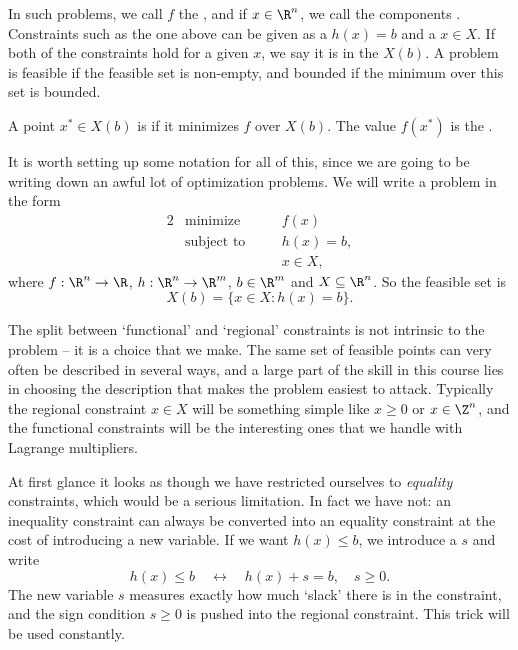 \documentclass[a4paper]{scrartcl}
\begin{document}
In such problems, we call $f$ the , and if $x \in \R^n$, we call the components . Constraints such as the one above can be given as a  $h(x) = b$ and a  $x \in X$. If both of the constraints hold for a given $x$, we say it is in the  $X(b)$. A problem is feasible if the feasible set is non-empty, and bounded if the minimum over this set is bounded.

A point $x^* \in X(b)$ is  if it minimizes $f$ over $X(b)$. The value $f(x^*)$ is the .

It is worth setting up some notation for all of this, since we are going to be writing down an awful lot of optimization problems. We will write a problem in the form
\begin{alignat*}{2}
    & \text{minimize} \quad && f(x) \\
    & \text{subject to} \quad && h(x) = b, \\
    & && x \in X,
\end{alignat*}
where $f : \R^n \rightarrow \R$, $h : \R^n \rightarrow \R^m$, $b \in \R^m$ and $X \subseteq \R^n$. So the feasible set is
$$
X(b) = \{x \in X : h(x) = b\}.
$$

\begin{remark}
    The split between `functional' and `regional' constraints is not intrinsic to the problem -- it is a choice that we make. The same set of feasible points can very often be described in several ways, and a large part of the skill in this course lies in choosing the description that makes the problem easiest to attack. Typically the regional constraint $x \in X$ will be something simple like $x \geq 0$ or $x \in \Z^n$, and the functional constraints will be the interesting ones that we handle with Lagrange multipliers.
\end{remark}

At first glance it looks as though we have restricted ourselves to \emph{equality} constraints, which would be a serious limitation. In fact we have not: an inequality constraint can always be converted into an equality constraint at the cost of introducing a new variable. If we want $h(x) \leq b$, we introduce a  $s$ and write
$$
h(x) \leq b \quad \longleftrightarrow \quad h(x) + s = b, \quad s \geq 0.
$$
The new variable $s$ measures exactly how much `slack' there is in the constraint, and the sign condition $s \geq 0$ is pushed into the regional constraint. This trick will be used constantly.
\end{document}
